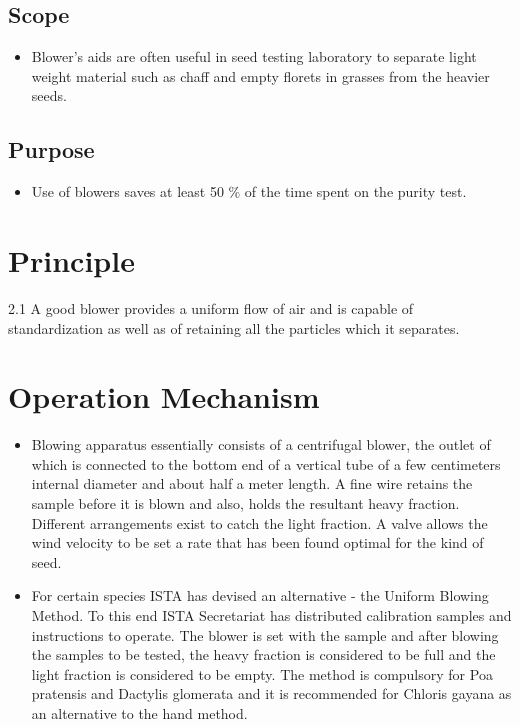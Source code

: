 \documentclass[]{book}
\providecommand{\tightlist}{%
  \setlength{\itemsep}{0pt}\setlength{\parskip}{0pt}}
\begin{document}
\subsection{Scope}\label{scope-1}

\begin{itemize}
\tightlist
\item
  Blower's aids are often useful in seed testing laboratory to separate
  light weight material such as chaff and empty florets in grasses from
  the heavier seeds.
\end{itemize}

\subsection{Purpose}\label{purpose}

\begin{itemize}
\tightlist
\item
  Use of blowers saves at least 50 \% of the time spent on the purity
  test.
\end{itemize}

\section{Principle}\label{principle}

2.1 A good blower provides a uniform flow of air and is capable of
standardization as well as of retaining all the particles which it
separates.

\section{Operation Mechanism}\label{operation-mechanism}

\begin{itemize}
\tightlist
\item
  Blowing apparatus essentially consists of a centrifugal blower, the
  outlet of which is connected to the bottom end of a vertical tube of a
  few centimeters internal diameter and about half a meter length. A
  fine wire retains the sample before it is blown and also, holds the
  resultant heavy fraction. Different arrangements exist to catch the
  light fraction. A valve allows the wind velocity to be set a rate that
  has been found optimal for the kind of seed.
\item
  For certain species ISTA has devised an alternative - the Uniform
  Blowing Method. To this end ISTA Secretariat has distributed
  calibration samples and instructions to operate. The blower is set
  with the sample and after blowing the samples to be tested, the heavy
  fraction is considered to be full and the light fraction is considered
  to be empty. The method is compulsory for Poa pratensis and Dactylis
  glomerata and it is recommended for Chloris gayana as an alternative
  to the hand method.
\end{itemize}
\end{document}
